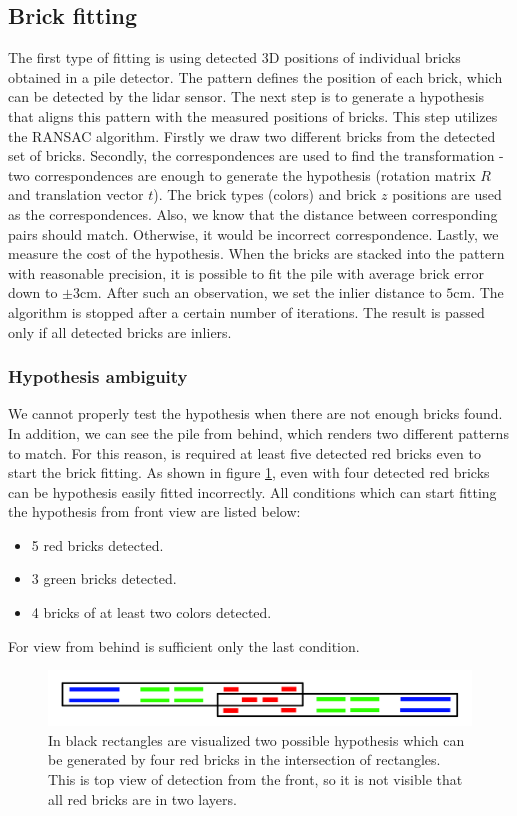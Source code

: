 \subsection{Brick fitting}
The first type of fitting is using detected 3D positions of individual bricks obtained in a pile detector. The pattern defines the position of each brick, which can be detected by the lidar sensor. The next step is to generate a hypothesis that aligns this pattern with the measured positions of bricks. This step utilizes the RANSAC algorithm. Firstly we draw two different bricks from the detected set of bricks. Secondly, the correspondences are used to find the transformation - two correspondences are enough to generate the hypothesis (rotation matrix $R$ and translation vector $t$). The brick types (colors) and brick $z$ positions are used as the correspondences. Also, we know that the distance between corresponding pairs should match. Otherwise, it would be incorrect correspondence. Lastly, we measure the cost of the hypothesis. When the bricks are stacked into the pattern with reasonable precision, it is possible to fit the pile with average brick error down to $\pm 3$cm. After such an observation, we set the inlier distance to $5$cm. The algorithm is stopped after a certain number of iterations. The result is passed only if all detected bricks are inliers.

\subsubsection{Hypothesis ambiguity}
We cannot properly test the hypothesis when there are not enough bricks found. In addition, we can see the pile from behind, which renders two different patterns to match. For this reason, is required at least five detected red bricks even to start the brick fitting. As shown in figure \ref{fig:ambiguity}, even with four detected red bricks can be hypothesis easily fitted incorrectly. All conditions which can start fitting the hypothesis from front view are listed below:
\begin{itemize}
\item 5 red bricks detected.
\item 3 green bricks detected.
\item 4 bricks of at least two colors detected.
\end{itemize}
For view from behind is sufficient only the last condition.
\begin{figure}[H]
\centering
\includegraphics[scale=0.3]{fig/ambiguous.png}
\caption[Hypothesis ambiguity]{In black rectangles are visualized two possible hypothesis which can be generated by four red bricks in the intersection of rectangles. This is top view of detection from the front, so it is not visible that all red bricks are in two layers.}
\label{fig:ambiguity}
\end{figure}

